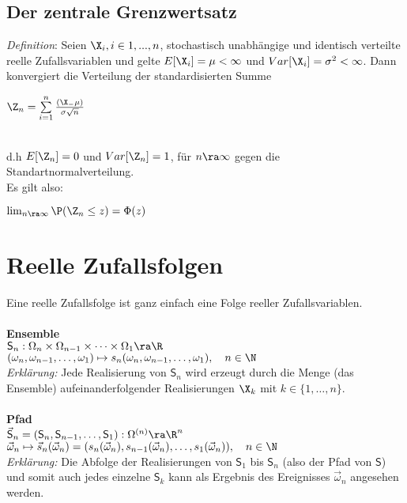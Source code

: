 \documentclass[german,color,6pt]{latex4ei/latex4ei_sheet}
\begin{document}
\begin{sectionbox}
	\subsection{Der zentrale Grenzwertsatz}
	\emph{Definition}: Seien $\X_i, i \in {1,...,n}$, stochastisch unabhängige und identisch
	verteilte reelle Zufallsvariablen und gelte $E[\X_i] = \mu < \infty$ und $Var[\X_i] = \sigma^2 < \infty$. 
	Dann konvergiert die Verteilung der standardisierten Summe\\ 
	\centerline{$\Z_n= \sum\limits_{i=1}^{n}\frac{(\X_-\mu)}{\sigma\sqrt{n}}$} \\
	d.h $E[\Z_n] = 0$ und $Var[\Z_n] = 1$, für $n \ra \infty$ gegen die Standartnormalverteilung. \\
	Es gilt also: \\
	\centerline{$\lim_{n \ra \infty} \P({\Z_n \le z}) = \Phi (z)$}
\end{sectionbox}	


\vfill

\section{Reelle Zufallsfolgen}
\begin{sectionbox}
	Eine reelle Zufallsfolge ist ganz einfach eine Folge reeller Zufallsvariablen. \\ \\
	\textbf{Ensemble} \\
	$\textsf{S}_n : \Omega_n \times \Omega_{n-1} \times \dots \times \Omega_1 \ra \R$\\
	$(\omega_n,\omega_{n-1},\dots,\omega_1) \mapsto s_n(\omega_n,\omega_{n-1},\dots,\omega_1), \quad n \in \N$\\
	\emph{Erklärung:} Jede Realisierung von $\textsf{S}_n$ wird erzeugt durch die Menge (das Ensemble) aufeinanderfolgender Realisierungen $\X_k$ mit $k \in \{1,\dots,n\}$. \\ \\	
	\textbf{Pfad} \\
	$\vec{\textsf{S}}_n = (\textsf{S}_n,\textsf{S}_{n-1},\dots,\textsf{S}_1) : \Omega^{(n)} \ra \R^n$\\
	$\vec{\omega}_n \mapsto \vec{s}_n(\vec{\omega}_n) = (s_n(\vec{\omega}_n),s_{n-1}(\vec{\omega}_n),\dots,s_1(\vec{\omega}_n)), \quad n \in \N$\\
	\emph{Erklärung:} Die Abfolge der Realisierungen von $\textsf{S}_1$ bis $\textsf{S}_n$ (also der Pfad von $\textsf{S}$) und somit auch jedes einzelne $\textsf{S}_k$ kann als Ergebnis des Ereignisses $\vec{\omega}_n$ angesehen werden.
\end{sectionbox}
\end{document}
